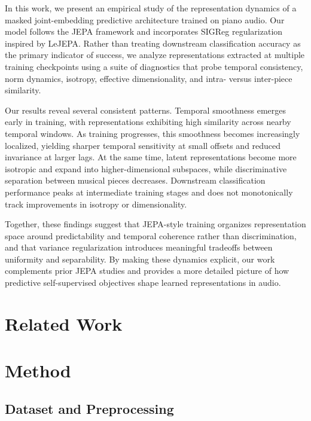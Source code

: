 \documentclass[10pt,twocolumn]{article}
\begin{document}
In this work, we present an empirical study of the representation dynamics of a masked joint-embedding predictive architecture trained on piano audio. Our model follows the JEPA framework and incorporates SIGReg regularization inspired by LeJEPA. Rather than treating downstream classification accuracy as the primary indicator of success, we analyze representations extracted at multiple training checkpoints using a suite of diagnostics that probe temporal consistency, norm dynamics, isotropy, effective dimensionality, and intra- versus inter-piece similarity.

Our results reveal several consistent patterns. Temporal smoothness emerges early in training, with representations exhibiting high similarity across nearby temporal windows. As training progresses, this smoothness becomes increasingly localized, yielding sharper temporal sensitivity at small offsets and reduced invariance at larger lags. At the same time, latent representations become more isotropic and expand into higher-dimensional subspaces, while discriminative separation between musical pieces decreases. Downstream classification performance peaks at intermediate training stages and does not monotonically track improvements in isotropy or dimensionality.

Together, these findings suggest that JEPA-style training organizes representation space around predictability and temporal coherence rather than discrimination, and that variance regularization introduces meaningful tradeoffs between uniformity and separability. By making these dynamics explicit, our work complements prior JEPA studies and provides a more detailed picture of how predictive self-supervised objectives shape learned representations in audio.

\section{Related Work}

\section{Method}

\subsection{Dataset and Preprocessing}
\label{sec:data}
\end{document}
